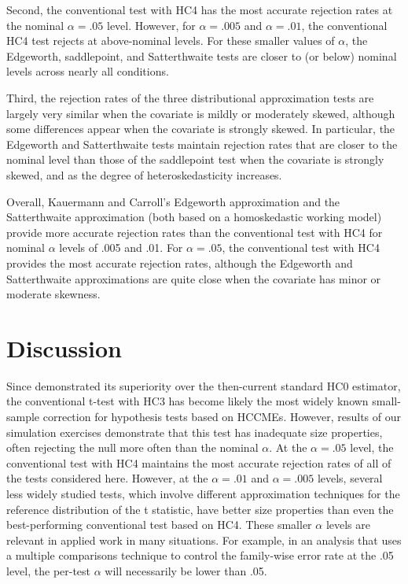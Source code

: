 \documentclass[12pt]{article}\usepackage[]{graphicx}\usepackage[]{color}
\begin{document}
Second, the conventional test with HC4 has the most accurate rejection rates at the nominal $\alpha = .05$ level. However, for $\alpha = .005$ and $\alpha = .01$, the conventional HC4 test rejects at above-nominal levels. For these smaller values of $\alpha$, the Edgeworth, saddlepoint, and Satterthwaite tests are closer to (or below) nominal levels across nearly all conditions. 

Third, the rejection rates of the three distributional approximation tests are largely very similar when the covariate is mildly or moderately skewed, although some differences appear when the covariate is strongly skewed. In particular, the Edgeworth and Satterthwaite tests maintain rejection rates that are closer to the nominal level than those of the saddlepoint test when the covariate is strongly skewed, and as the degree of heteroskedasticity increases. 

Overall, Kauermann and Carroll's Edgeworth approximation and the Satterthwaite approximation (both based on a homoskedastic working model) provide more accurate rejection rates than the conventional test with HC4 for nominal $\alpha$ levels of .005 and .01. For $\alpha = .05$, the conventional test with HC4 provides the most accurate rejection rates, although the Edgeworth and Satterthwaite approximations are quite close when the covariate has minor or moderate skewness. 

\section{Discussion}
\label{sec:discussion}

Since \citet{Long2000using} demonstrated its superiority over the then-current standard HC0 estimator, the conventional t-test with HC3 has become likely the most widely known small-sample correction for hypothesis tests based on HCCMEs. However, results of our simulation exercises demonstrate that this test has inadequate size properties, often rejecting the null more often than the nominal $\alpha$. At the $\alpha = .05$ level, the conventional test with HC4 maintains the most accurate rejection rates of all of the tests considered here. However, at the $\alpha = .01$ and $\alpha = .005$ levels, several less widely studied tests, which involve different approximation techniques for the reference distribution of the t statistic, have better size properties than even the best-performing conventional test based on HC4. These smaller $\alpha$ levels are relevant in applied work in many situations. For example, in an analysis that uses a multiple comparisons technique to control the family-wise error rate at the .05 level, the per-test $\alpha$ will necessarily be lower than .05. 
\end{document}
